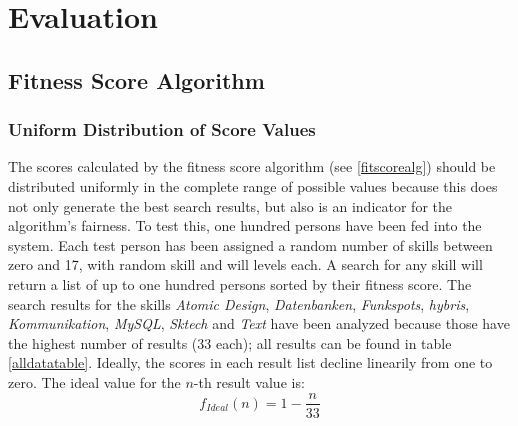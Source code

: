 \chapter{Evaluation}

\section{Fitness Score Algorithm}

\subsection{Uniform Distribution of Score Values}
The scores calculated by the fitness score algorithm (see \ref{fitscorealg}) should be distributed uniformly in the complete range of possible values because this does not only generate the best search results, but also is an indicator for the algorithm's fairness.
To test this, one hundred persons have been fed into the system. Each test person has been assigned a random number of skills between zero and 17, with random skill and will levels each. A search for any skill will return a list of up to one hundred persons sorted by their fitness score. The search results for the skills \textit{Atomic Design}, \textit{Datenbanken}, \textit{Funkspots}, \textit{hybris}, \textit{Kommunikation}, \textit{MySQL}, \textit{Sktech} and \textit{Text} have been analyzed because those have the highest number of results (33 each); all results can be found in table \ref{alldatatable}. Ideally, the scores in each result list decline linearily from one to zero. The ideal value for the $n$-th result value is:
\[
	f_{Ideal}(n) = 1 - \frac{n}{33}
\]

